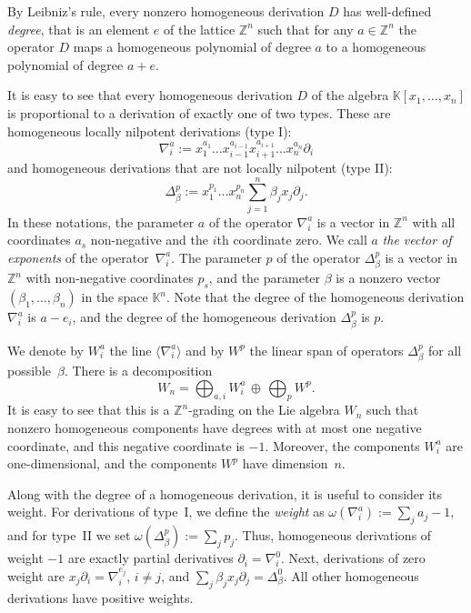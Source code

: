 \documentclass[a4paper, 12pt,oneside,reqno]{amsart}
\numberwithin{equation}{section}
\theoremstyle{definition}
\begin{document}
By Leibniz's rule, every nonzero homogeneous derivation $D$ has well-defined {\it degree}, that is an element $e$ of the lattice $\mathbb{Z}^n$ such that for any $a\in\mathbb {Z}^n$ the operator $D$ maps a homogeneous polynomial of degree $a$ to a homogeneous polynomial of degree $a+e$.

It is easy to see that every homogeneous derivation $D$ of the algebra $\mathbb{K}[x_1,\ldots,x_n]$ is proportional to a derivation of exactly one of two types. These are homogeneous locally nilpotent derivations (type I):
$$
\nabla^a_i:= x_1^{a_1}\ldots x_{i-1}^{a_{i-1}}x_{i+1}^{a_{i+1}}\ldots x_n^{a_n}\partial_i
$$
and homogeneous derivations that are not locally nilpotent (type II):
$$
\Delta^p_{\beta}:=x_1^{p_1}\ldots x_n^{p_n} \sum_{j=1}^n \beta_jx_j\partial_j.
$$
In these notations, the parameter $a$ of the operator $\nabla^a_i$ is a vector in $\mathbb{Z}^n$ with all coordinates $a_s$ non-negative and the $i$th coordinate zero. We call $a$ {\it the vector of exponents} of the operator~$\nabla^a_i$. The parameter $p$ of the operator $\Delta^p_{\beta}$ is a vector in $\mathbb{Z}^n$ with non-negative coordinates $p_s$, and the parameter $\beta$ is a nonzero vector $(\beta_1,\ldots,\beta_n)$ in the space $\mathbb{K}^n$. Note that the degree of the homogeneous derivation $\nabla^a_i$ is $a-e_i$, and the degree of the homogeneous derivation $\Delta^p_{\beta}$ is $p$. 

We denote by $W^a_i$ the line $\langle\nabla^a_i\rangle$ and by $W^p$ the linear span of operators $\Delta^p_{\beta}$ for all possible~$\beta$. 
There is a decomposition
$$
W_n=\bigoplus_{a,i} W^a_i \, \oplus \, \bigoplus_p W^p.
$$ 
It is easy to see that this is a $\mathbb{Z}^n$-grading on the Lie algebra $W_n$ such that nonzero homogeneous components have degrees with at most one negative coordinate, and this negative coordinate is $-1$. Moreover, the components $W^a_i$ are one-dimensional, and the components $W^p$ have dimension~$n$. 

Along with the degree of a homogeneous derivation, it is useful to consider its weight. For derivations of type~I, we define the {\it weight} as 
$\omega(\nabla^a_i):=\sum_j a_j-1$, and for type~II we set $\omega(\Delta^p_{\beta}):=\sum_j p_j$. Thus, homogeneous derivations of weight $-1$ are exactly partial derivatives $\partial_i=\nabla^0_i$. Next, derivations of zero weight are $x_j\partial_i=\nabla^{e_j}_i$, $i\ne j$, and $\sum_j\beta_jx_j\partial_j=\Delta^0_{\beta}$. All other homogeneous derivations have positive weights.
\end{document}
